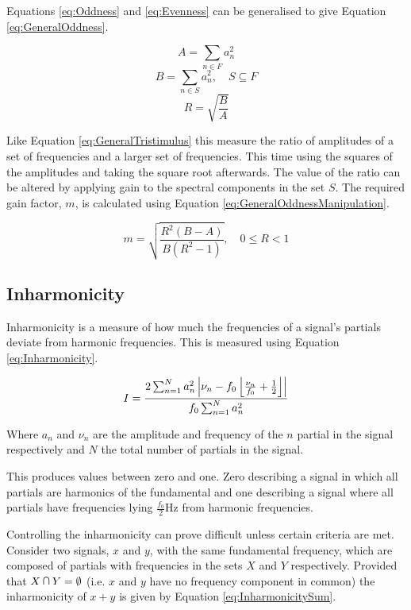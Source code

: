 		Equations \ref{eq:Oddness} and \ref{eq:Evenness} can be generalised to give Equation
		\ref{eq:GeneralOddness}.

		\[ A = \sum_{n \in F} a_{n}^{2} \]
		\[ B = \sum_{n \in S} a_{n}^{2}, \quad S \subseteq F \]
		\begin{equation}
			R = \sqrt{\frac{B}{A}}
			\label{eq:GeneralOddness}
		\end{equation}

		Like Equation \ref{eq:GeneralTristimulus} this measure the ratio of amplitudes of a set of frequencies and
		a larger set of frequencies. This time using the squares of the amplitudes and taking the square root
		afterwards. The value of the ratio can be altered by applying gain to the spectral components in the set
		$S$. The required gain factor, $m$, is calculated using Equation \ref{eq:GeneralOddnessManipulation}.

		\begin{equation}
			m = \sqrt{\frac{R^{2}(B - A)}{B(R^{2} - 1)}}, \quad 0 \leq R < 1
			\label{eq:GeneralOddnessManipulation}
		\end{equation}

	\subsection{Inharmonicity}
	\label{sec:FetureControl-Parameterisation-Inharmonicity}
		Inharmonicity is a measure of how much the frequencies of a signal's partials deviate from harmonic
		frequencies. This is measured using Equation \ref{eq:Inharmonicity}.
		
		\begin{equation}
			I = \frac{2\sum_{n = 1}^{N}a_{n}^{2}
			           \left|\nu_{n} - f_{0}\left\lfloor\frac{\nu_{n}}{f_{0}} + \frac{1}{2}\right\rfloor\right|}
				   {f_{0}\sum_{n = 1}^{N} a_{n}^{2}}
			\label{eq:Inharmonicity}
		\end{equation}

		Where $a_{n}$ and $\nu_{n}$ are the amplitude and frequency of the $n$ partial in the signal
		respectively and $N$ the total number of partials in the signal.

		This produces values between zero and one. Zero describing a signal in which all partials are harmonics of
		the fundamental and one describing a signal where all partials have frequencies lying
		$\frac{f_{0}}{2}$Hz from harmonic frequencies.

		Controlling the inharmonicity can prove difficult unless certain criteria are met. Consider two signals,
		$x$ and $y$, with the same fundamental frequency, which are composed of partials with frequencies in the
		sets $X$ and $Y$ respectively. Provided that $X \medcap Y = \emptyset$ (i.e. $x$ and $y$ have no frequency
		component in common) the inharmonicity of $x + y$ is given by Equation \ref{eq:InharmonicitySum}.

